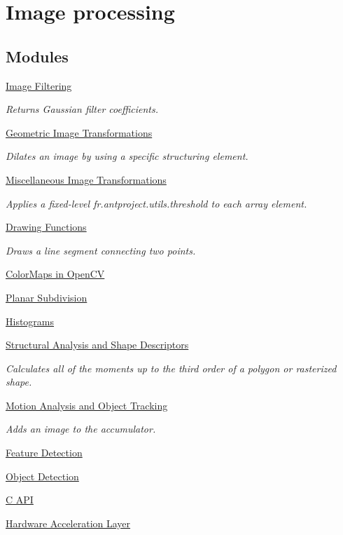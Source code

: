 \hypertarget{group__imgproc}{}\section{Image processing}
\label{group__imgproc}
\subsection*{Modules}
\begin{DoxyCompactItemize}
\item 
\hyperlink{group__imgproc__filter}{Image Filtering}
\begin{DoxyCompactList}\small\item\em Returns Gaussian filter coefficients. \end{DoxyCompactList}\item 
\hyperlink{group__imgproc__transform}{Geometric Image Transformations}
\begin{DoxyCompactList}\small\item\em Dilates an image by using a specific structuring element. \end{DoxyCompactList}\item 
\hyperlink{group__imgproc__misc}{Miscellaneous Image Transformations}
\begin{DoxyCompactList}\small\item\em Applies a fixed-\/level fr.antproject.utils.threshold to each array element. \end{DoxyCompactList}\item
\hyperlink{group__imgproc__draw}{Drawing Functions}
\begin{DoxyCompactList}\small\item\em Draws a line segment connecting two points. \end{DoxyCompactList}\item 
\hyperlink{group__imgproc__colormap}{Color\+Maps in Open\+CV}
\item 
\hyperlink{group__imgproc__subdiv2d}{Planar Subdivision}
\item 
\hyperlink{group__imgproc__hist}{Histograms}
\item 
\hyperlink{group__imgproc__shape}{Structural Analysis and Shape Descriptors}
\begin{DoxyCompactList}\small\item\em Calculates all of the moments up to the third order of a polygon or rasterized shape. \end{DoxyCompactList}\item 
\hyperlink{group__imgproc__motion}{Motion Analysis and Object Tracking}
\begin{DoxyCompactList}\small\item\em Adds an image to the accumulator. \end{DoxyCompactList}\item 
\hyperlink{group__imgproc__feature}{Feature Detection}
\item 
\hyperlink{group__imgproc__object}{Object Detection}
\item 
\hyperlink{group__imgproc__c}{C A\+PI}
\item 
\hyperlink{group__imgproc__hal}{Hardware Acceleration Layer}
\end{DoxyCompactItemize}
